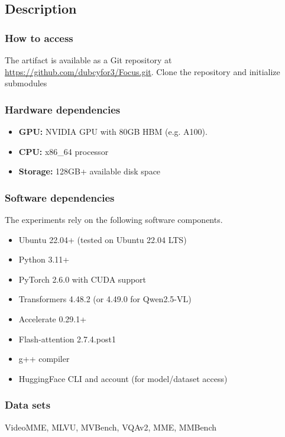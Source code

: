 \subsection{Description}

\subsubsection{How to access}

The artifact is available as a Git repository at \href{https://github.com/dubcyfor3/Focus.git}{https://github.com/dubcyfor3/Focus.git}. Clone the repository and initialize submodules


\subsubsection{Hardware dependencies}

\begin{itemize}
  \item \textbf{GPU:} NVIDIA GPU with 80GB HBM (e.g. A100).
  \item \textbf{CPU:} x86\_64 processor
  \item \textbf{Storage:} 128GB+ available disk space
\end{itemize}

\subsubsection{Software dependencies}
The experiments rely on the following software components.
\begin{itemize}
  \item Ubuntu 22.04+ (tested on Ubuntu 22.04 LTS)
  \item Python 3.11+
  \item PyTorch 2.6.0 with CUDA support
  \item Transformers 4.48.2 (or 4.49.0 for Qwen2.5-VL)
  \item Accelerate 0.29.1+
  \item Flash-attention 2.7.4.post1
  \item g++ compiler
  \item HuggingFace CLI and account (for model/dataset access)
\end{itemize}

\subsubsection{Data sets} VideoMME, MLVU, MVBench, VQAv2, MME, MMBench


